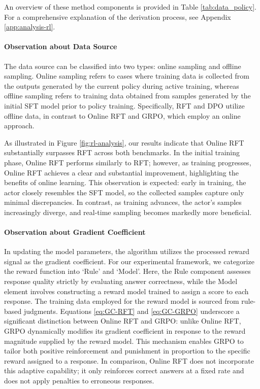 \begin{itemize}[topsep=0pt]
An overview of these method components is provided in Table \ref{tab:data_policy}. For a comprehensive explanation of the derivation process, see Appendix \ref{app:analysis-rl}.

\paragraph{Observation about Data Source} The data source can be classified into two types: online sampling and offline sampling. Online sampling refers to cases where training data is collected from the outputs generated by the current policy during active training, whereas offline sampling refers to training data obtained from samples generated by the initial SFT model prior to policy training. Specifically, RFT and DPO utilize offline data, in contrast to Online RFT and GRPO, which employ an online approach.

As illustrated in Figure \ref{fig:rl-analysis}, our results indicate that Online RFT substantially surpasses RFT across both benchmarks. In the initial training phase, Online RFT performs similarly to RFT; however, as training progresses, Online RFT achieves a clear and substantial improvement, highlighting the benefits of online learning. This observation is expected: early in training, the actor closely resembles the SFT model, so the collected samples capture only minimal discrepancies. In contrast, as training advances, the actor's samples increasingly diverge, and real-time sampling becomes markedly more beneficial.

\paragraph{Observation about Gradient Coefficient} In updating the model parameters, the algorithm utilizes the processed reward signal as the gradient coefficient. For our experimental framework, we categorize the reward function into `Rule' and `Model'. Here, the Rule component assesses response quality strictly by evaluating answer correctness, while the Model element involves constructing a reward model trained to assign a score to each response. The training data employed for the reward model is sourced from rule-based judgments. Equations \ref{eq:GC-RFT} and \ref{eq:GC-GRPO} underscore a significant distinction between Online RFT and GRPO: unlike Online RFT, GRPO dynamically modifies its gradient coefficient in response to the reward magnitude supplied by the reward model. This mechanism enables GRPO to tailor both positive reinforcement and punishment in proportion to the specific reward assigned to a response. In comparison, Online RFT does not incorporate this adaptive capability; it only reinforces correct answers at a fixed rate and does not apply penalties to erroneous responses.


\end{itemize}
